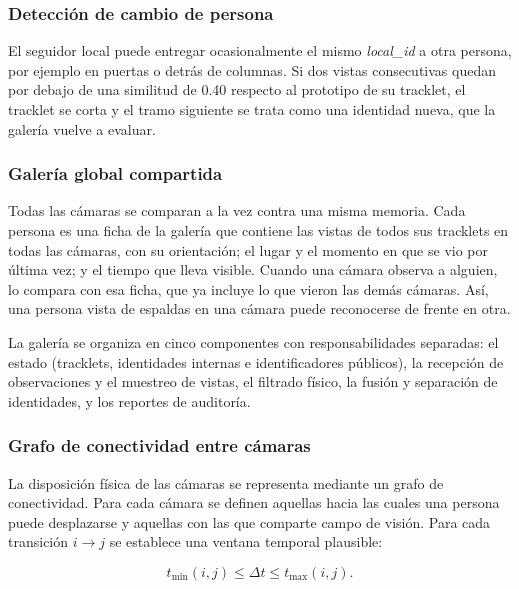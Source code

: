 \documentclass[12pt,letterpaper]{article}
\begin{document}
\subsubsection{Detección de cambio de persona}

El seguidor local puede entregar ocasionalmente el mismo
\textit{local\_id} a otra persona, por ejemplo en puertas o detrás de
columnas. Si dos vistas consecutivas quedan por debajo de una similitud
de 0.40 respecto al prototipo de su tracklet, el tracklet se corta y el
tramo siguiente se trata como una identidad nueva, que la galería vuelve
a evaluar.

\subsubsection{Galería global compartida}

Todas las cámaras se comparan a la vez contra una misma memoria. Cada
persona es una ficha de la galería que contiene las vistas de todos sus
tracklets en todas las cámaras, con su orientación; el lugar y el
momento en que se vio por última vez; y el tiempo que lleva visible.
Cuando una cámara observa a alguien, lo compara con esa ficha, que ya
incluye lo que vieron las demás cámaras. Así, una persona vista de
espaldas en una cámara puede reconocerse de frente en otra.

La galería se organiza en cinco componentes con responsabilidades
separadas: el estado (tracklets, identidades internas e identificadores
públicos), la recepción de observaciones y el muestreo de vistas, el
filtrado físico, la fusión y separación de identidades, y los reportes
de auditoría.

\subsubsection{Grafo de conectividad entre cámaras}

La disposición física de las cámaras se representa mediante un grafo de
conectividad. Para cada cámara se definen aquellas hacia las cuales una
persona puede desplazarse y aquellas con las que comparte campo de
visión. Para cada transición $i\rightarrow j$ se establece una ventana
temporal plausible:

\begin{equation}
t_{\min}(i,j)
\leq
\Delta t
\leq
t_{\max}(i,j).
\end{equation}
\end{document}
